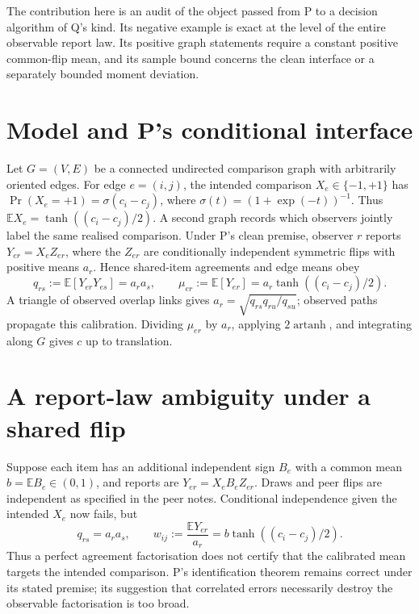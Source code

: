 \documentclass{article}
\begin{document}
The contribution here is an audit of the object passed from P to a decision algorithm of Q's kind.
Its negative example is exact at the level of the entire observable report law. Its positive graph
statements require a constant positive common-flip mean, and its sample bound concerns the clean
interface or a separately bounded moment deviation. %

\section{Model and P's conditional interface}
Let \(G=(V,E)\) be a connected undirected comparison graph with arbitrarily oriented edges. For edge
\(e=(i,j)\), the intended comparison \(X_e\in\{-1,+1\}\) has \(\Pr(X_e=+1)=\sigma(c_i-c_j)\), where
\(\sigma(t)=(1+\exp(-t))^{-1}\). Thus \(\mathbb E X_e=\tanh((c_i-c_j)/2)\). A second graph records
which observers jointly label the same realised comparison. %
Under P's clean premise, observer \(r\) reports \(Y_{er}=X_eZ_{er}\), where the \(Z_{er}\) are
conditionally independent symmetric flips with positive means \(a_r\). Hence shared-item agreements
and edge means obey
\[
q_{rs}:=\mathbb E[Y_{er}Y_{es}]=a_ra_s,
\qquad
\mu_{er}:=\mathbb E[Y_{er}]=a_r\tanh((c_i-c_j)/2).
\]
A triangle of observed overlap links gives \(a_r=\sqrt{q_{rs}q_{ru}/q_{su}}\); observed paths
propagate this calibration. Dividing \(\mu_{er}\) by \(a_r\), applying \(2\operatorname{artanh}\),
and integrating along \(G\) gives \(c\) up to translation. %

\section{A report-law ambiguity under a shared flip}
Suppose each item has an additional independent sign \(B_e\) with a common mean \(b=\mathbb E
B_e\in(0,1)\), and reports are \(Y_{er}=X_eB_eZ_{er}\). Draws and peer flips are independent as
specified in the peer notes. Conditional independence given the intended \(X_e\) now fails, but
\[
q_{rs}=a_ra_s,
\qquad
w_{ij}:=\frac{\mathbb E Y_{er}}{a_r}
=b\tanh((c_i-c_j)/2).
\]
Thus a perfect agreement factorisation does not certify that the calibrated mean targets the
intended comparison. P's identification theorem remains correct under its stated premise; its
suggestion that correlated errors necessarily destroy the observable factorisation is too broad. %
\end{document}
